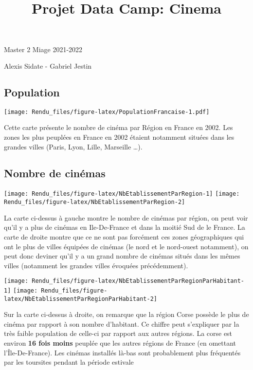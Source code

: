 \documentclass[
]{article}
\title{Projet Data Camp: Cinema}
\author{}
\date{\vspace{-2.5em}}
\begin{document}
\maketitle

Master 2 Miage 2021-2022

Alexis Sidate - Gabriel Jestin

\hypertarget{population}{%
\subsection{Population}\label{population}}

\texttt{[image: Rendu\_files/figure-latex/PopulationFrancaise-1.pdf]}

Cette carte présente le nombre de cinéma par Région en France en 2002.
Les zones les plus peuplées en France en 2002 étaient notamment situées
dans les grandes villes (Paris, Lyon, Lille, Marseille \ldots).

\hypertarget{nombre-de-cinuxe9mas}{%
\subsection{Nombre de cinémas}\label{nombre-de-cinuxe9mas}}

\texttt{[image: Rendu\_files/figure-latex/NbEtablissementParRegion-1]}
\texttt{[image: Rendu\_files/figure-latex/NbEtablissementParRegion-2]}

La carte ci-dessus à gauche montre le nombre de cinémas par région, on
peut voir qu'il y a plus de cinémas en Ile-De-France et dans la moitié
Sud de le France. La carte de droite montre que ce ne sont pas forcément
ces zones géographiques qui ont le plus de villes équipées de cinémas
(le nord et le nord-ouest notamment), on peut donc deviner qu'il y a un
grand nombre de cinémas situés dans les mêmes villes (notamment les
grandes villes évoquées précédemment).

\texttt{[image: Rendu\_files/figure-latex/NbEtablissementParRegionParHabitant-1]}
\texttt{[image: Rendu\_files/figure-latex/NbEtablissementParRegionParHabitant-2]}

Sur la carte ci-dessus à droite, on remarque que la région Corse possède
le plus de cinéma par rapport à son nombre d'habitant. Ce chiffre peut
s'expliquer par la très faible population de celle-ci par rapport aux
autres régions. La corse est environ \textbf{16 fois moins} peuplée que
les autres régions de France (en omettant l'Île-De-France). Les cinémas
installés là-bas sont probablement plus fréquentés par les toursites
pendant la période estivale
\end{document}
